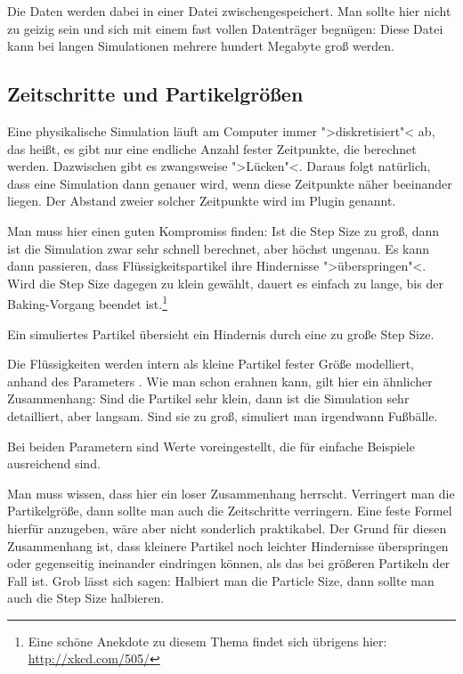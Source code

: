 \documentclass[10pt,DIV=14,a4paper]{scrartcl}
\begin{document}
Die Daten werden dabei in einer Datei zwischengespeichert. Man sollte
hier nicht zu geizig sein und sich mit einem fast vollen Datenträger
begnügen: Diese Datei kann bei langen Simulationen mehrere hundert
Megabyte groß werden.

\subsection{Zeitschritte und Partikelgrößen}
Eine physikalische Simulation läuft am Computer immer ">diskretisiert"<
ab, das heißt, es gibt nur eine endliche Anzahl fester Zeitpunkte, die
berechnet werden. Dazwischen gibt es zwangsweise ">Lücken"<. Daraus
folgt natürlich, dass eine Simulation dann genauer wird, wenn diese
Zeitpunkte näher beeinander liegen. Der Abstand zweier solcher
Zeitpunkte wird im Plugin  genannt.

Man muss hier einen guten Kompromiss finden: Ist die Step Size zu groß,
dann ist die Simulation zwar sehr schnell berechnet, aber höchst
ungenau. Es kann dann passieren, dass Flüssigkeitspartikel ihre
Hindernisse ">überspringen"<. Wird die Step Size dagegen zu klein
gewählt, dauert es einfach zu lange, bis der Baking-Vorgang beendet
ist.\footnote{Eine schöne Anekdote zu diesem Thema findet sich übrigens
hier: \url{http://xkcd.com/505/}}

{Ein simuliertes Partikel übersieht ein Hindernis durch eine zu große
Step Size.}

Die Flüssigkeiten werden intern als kleine Partikel fester Größe
modelliert, anhand des Parameters . Wie man schon
erahnen kann, gilt hier ein ähnlicher Zusammenhang: Sind die Partikel
sehr klein, dann ist die Simulation sehr detailliert, aber langsam. Sind
sie zu groß, simuliert man irgendwann Fußbälle.

Bei beiden Parametern sind Werte voreingestellt, die für einfache
Beispiele ausreichend sind.

Man muss wissen, dass hier ein loser Zusammenhang herrscht. Verringert
man die Partikelgröße, dann sollte man auch die Zeitschritte verringern.
Eine feste Formel hierfür anzugeben, wäre aber nicht sonderlich
praktikabel. Der Grund für diesen Zusammenhang ist, dass kleinere
Partikel noch leichter Hindernisse überspringen oder gegenseitig
ineinander eindringen können, als das bei größeren Partikeln der Fall
ist. Grob lässt sich sagen: Halbiert man die Particle Size, dann sollte
man auch die Step Size halbieren.
\end{document}
